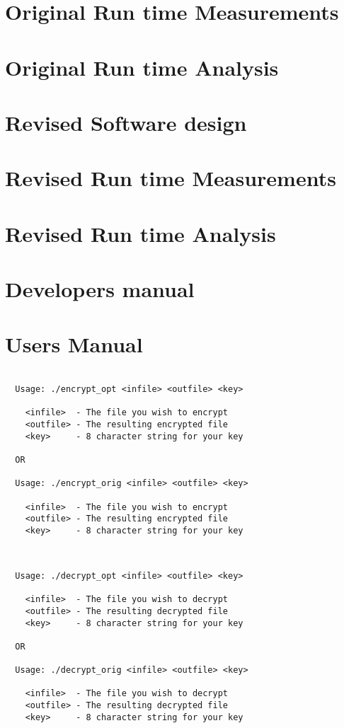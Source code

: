 \documentclass[12pt]{article}
\begin{document}
\section{Original Run time Measurements}
\section{Original Run time Analysis}
\section{Revised Software design}
\section{Revised Run time Measurements}
\section{Revised Run time Analysis}
\section{Developers manual}
\section{Users Manual}

\begin{verbatim}

  Usage: ./encrypt_opt <infile> <outfile> <key>

    <infile>  - The file you wish to encrypt
    <outfile> - The resulting encrypted file
    <key>     - 8 character string for your key

  OR

  Usage: ./encrypt_orig <infile> <outfile> <key>

    <infile>  - The file you wish to encrypt
    <outfile> - The resulting encrypted file
    <key>     - 8 character string for your key


\end{verbatim}

\begin{verbatim}

  Usage: ./decrypt_opt <infile> <outfile> <key>

    <infile>  - The file you wish to decrypt
    <outfile> - The resulting decrypted file
    <key>     - 8 character string for your key

  OR

  Usage: ./decrypt_orig <infile> <outfile> <key>

    <infile>  - The file you wish to decrypt
    <outfile> - The resulting decrypted file
    <key>     - 8 character string for your key

\end{verbatim}
\end{document}
